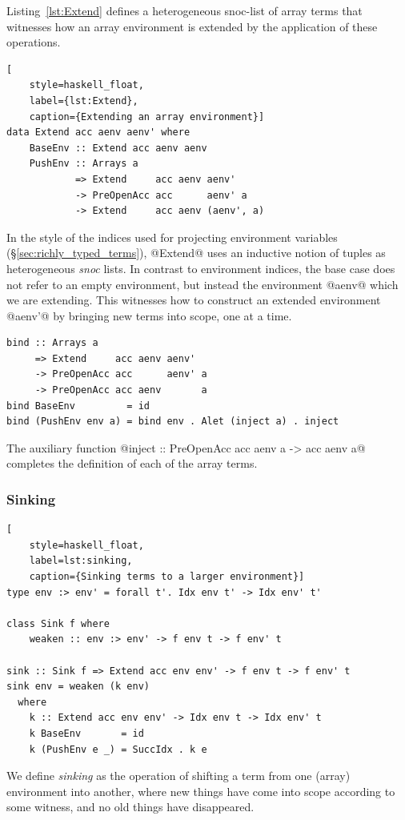 Listing~\ref{lst:Extend} defines a heterogeneous snoc-list of array terms that
witnesses how an array environment is extended by the application of these
operations.
%
\begin{lstlisting}[
    style=haskell_float,
    label={lst:Extend},
    caption={Extending an array environment}]
data Extend acc aenv aenv' where
    BaseEnv :: Extend acc aenv aenv
    PushEnv :: Arrays a
            => Extend     acc aenv aenv'
            -> PreOpenAcc acc      aenv' a
            -> Extend     acc aenv (aenv', a)
\end{lstlisting}
%
In the style of the  indices used for projecting environment
variables (\S\ref{sec:richly_typed_terms}), @Extend@ uses an inductive notion of
tuples as heterogeneous \emph{snoc} lists. In contrast to environment indices,
the base case does not refer to an empty environment, but instead the
environment @aenv@ which we are extending. This witnesses how to construct an
extended environment @aenv'@ by bringing new terms into scope, one at a time.
%
\begin{lstlisting}[style=haskell]
bind :: Arrays a
     => Extend     acc aenv aenv'
     -> PreOpenAcc acc      aenv' a
     -> PreOpenAcc acc aenv       a
bind BaseEnv         = id
bind (PushEnv env a) = bind env . Alet (inject a) . inject
\end{lstlisting}
%
The auxiliary function @inject :: PreOpenAcc acc aenv a -> acc aenv a@ completes
the definition of each of the array terms.


\subsubsection{Sinking}
\label{sec:sinking}

\begin{lstlisting}[
    style=haskell_float,
    label=lst:sinking,
    caption={Sinking terms to a larger environment}]
type env :> env' = forall t'. Idx env t' -> Idx env' t'

class Sink f where
    weaken :: env :> env' -> f env t -> f env' t

sink :: Sink f => Extend acc env env' -> f env t -> f env' t
sink env = weaken (k env)
  where
    k :: Extend acc env env' -> Idx env t -> Idx env' t
    k BaseEnv       = id
    k (PushEnv e _) = SuccIdx . k e
\end{lstlisting}

We define \emph{sinking} as the operation of shifting a term from one (array)
environment into another, where new things have come into scope according to
some witness, and no old things have disappeared.

